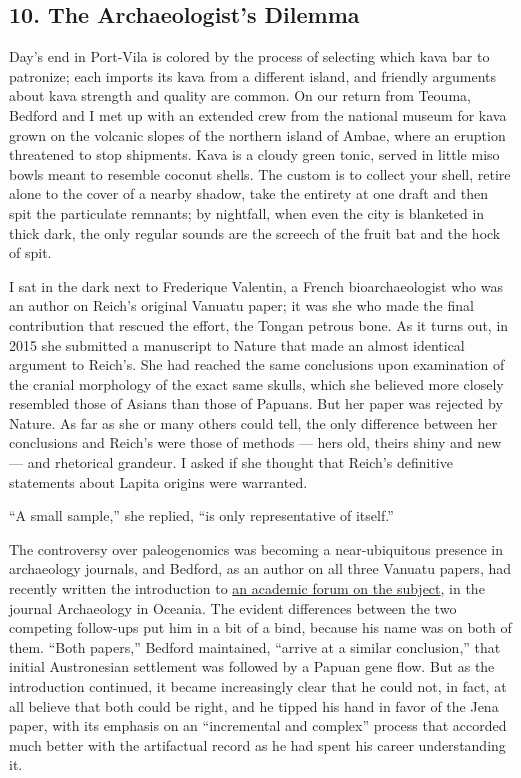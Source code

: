 \hypertarget{10-the-archaeologists-dilemma}{%
\subsection{\texorpdfstring{\textbf{10. The Archaeologist's
Dilemma}}{10. The Archaeologist's Dilemma}}\label{10-the-archaeologists-dilemma}}

Day's end in Port-Vila is colored by the process of selecting which kava
bar to patronize; each imports its kava from a different island, and
friendly arguments about kava strength and quality are common. On our
return from Teouma, Bedford and I met up with an extended crew from the
national museum for kava grown on the volcanic slopes of the northern
island of Ambae, where an eruption threatened to stop shipments. Kava is
a cloudy green tonic, served in little miso bowls meant to resemble
coconut shells. The custom is to collect your shell, retire alone to the
cover of a nearby shadow, take the entirety at one draft and then spit
the particulate remnants; by nightfall, when even the city is blanketed
in thick dark, the only regular sounds are the screech of the fruit bat
and the hock of spit.

I sat in the dark next to Frederique Valentin, a French bioarchaeologist
who was an author on Reich's original Vanuatu paper; it was she who made
the final contribution that rescued the effort, the Tongan petrous bone.
As it turns out, in 2015 she submitted a manuscript to Nature that made
an almost identical argument to Reich's. She had reached the same
conclusions upon examination of the cranial morphology of the exact same
skulls, which she believed more closely resembled those of Asians than
those of Papuans. But her paper was rejected by Nature. As far as she or
many others could tell, the only difference between her conclusions and
Reich's were those of methods --- hers old, theirs shiny and new --- and
rhetorical grandeur. I asked if she thought that Reich's definitive
statements about Lapita origins were warranted.

``A small sample,'' she replied, ``is only representative of itself.''

The controversy over paleogenomics was becoming a near-ubiquitous
presence in archaeology journals, and Bedford, as an author on all three
Vanuatu papers, had recently written the introduction to
\href{https://onlinelibrary.wiley.com/doi/full/10.1002/arco.5165}{an
academic forum on the subject}, in the journal Archaeology in Oceania.
The evident differences between the two competing follow-ups put him in
a bit of a bind, because his name was on both of them. ``Both papers,''
Bedford maintained, ``arrive at a similar conclusion,'' that initial
Austronesian settlement was followed by a Papuan gene flow. But as the
introduction continued, it became increasingly clear that he could not,
in fact, at all believe that both could be right, and he tipped his hand
in favor of the Jena paper, with its emphasis on an ``incremental and
complex'' process that accorded much better with the artifactual record
as he had spent his career understanding it.

